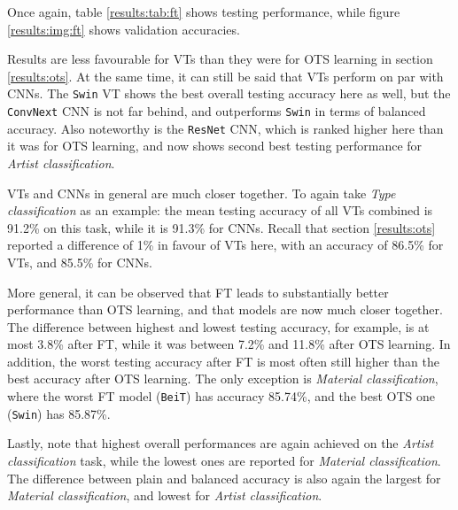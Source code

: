Once again, table \ref{results:tab:ft} shows testing performance, while figure \ref{results:img:ft} shows validation accuracies.

Results are less favourable for VTs than they were for OTS learning in section \ref{results:ots}. At the same time, it can still be said that VTs perform on par with CNNs. The \texttt{Swin} VT shows the best overall testing accuracy here as well, but the \texttt{ConvNext} CNN is not far behind, and outperforms \texttt{Swin} in terms of balanced accuracy. Also noteworthy is the \texttt{ResNet} CNN, which is ranked higher here than it was for OTS learning, and now shows second best testing performance for \textit{Artist classification}.

VTs and CNNs in general are much closer together. To again take \textit{Type classification} as an example: the mean testing accuracy of all VTs combined is 91.2\% on this task, while it is 91.3\% for CNNs. Recall that section \ref{results:ots} reported a difference of 1\% in favour of VTs here, with an accuracy of 86.5\% for VTs, and 85.5\% for CNNs.

More general, it can be observed that FT leads to substantially better performance than OTS learning, and that models are now much closer together. The difference between highest and lowest testing accuracy, for example, is at most 3.8\% after FT, while it was between 7.2\% and 11.8\% after OTS learning. In addition, the worst testing accuracy after FT is most often still higher than the best accuracy after OTS learning. The only exception is \textit{Material classification}, where the worst FT model (\texttt{BeiT}) has accuracy 85.74\%, and the best OTS one (\texttt{Swin}) has 85.87\%.

Lastly, note that highest overall performances are again achieved on the \textit{Artist classification} task, while the lowest ones are reported for \textit{Material classification}. The difference between plain and balanced accuracy is also again the largest for \textit{Material classification}, and lowest for \textit{Artist classification}.



